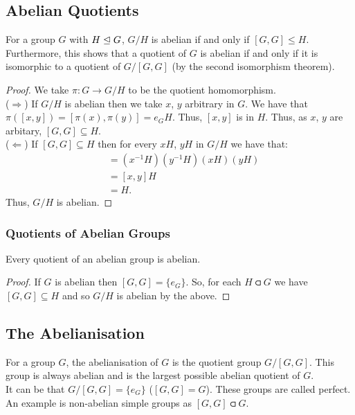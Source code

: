 \subsection{Abelian Quotients} \label{2.28}

For a group $G$ with $H \trianglelefteq G$, $G/H$ is abelian if and only if 
$[G, G] \leq H$. Furthermore, this shows that a quotient of $G$
is abelian if and only if it is isomorphic to a quotient of $G/[G, G]$
(by the second isomorphism theorem).

\begin{proof}
    We take $\pi : G \to G/H$ to be the quotient homomorphism.
    \\[\baselineskip]
    ($\Rightarrow$) 
    If $G/H$ is abelian then we take $x$, $y$ arbitrary in $G$. 
    We have that $\pi([x, y]) = [\pi(x), \pi(y)] = e_GH$. 
    Thus, $[x, y]$ is in $H$. 
    Thus, as $x$, $y$ are arbitary, $[G, G] \subseteq H$.
    \\[\baselineskip]
    ($\Leftarrow$)
    If $[G, G] \subseteq H$ then for every $xH$, $yH$ in $G/H$ we have
    that: \begin{align*}
        [xH, yH] &= (x^{-1}H)(y^{-1}H)(xH)(yH) \\
        &= [x, y]H \\
        &= H.
    \end{align*} Thus, $G/H$ is abelian.
\end{proof}

\subsubsection{Quotients of Abelian Groups}

Every quotient of an abelian group is abelian.

\begin{proof}
    If $G$ is abelian then $[G, G] = \{e_G\}$. So, for each $H \csub G$
    we have $[G, G] \subseteq H$ and so $G/H$ is abelian by the above.
\end{proof}

\subsection{The Abelianisation}

For a group $G$, the abelianisation of $G$ is the quotient group 
$G/[G, G]$. This group is always abelian and is the largest possible
abelian quotient of $G$.
\\[\baselineskip]
It can be that $G/[G, G] = \{e_G\}$ ($[G, G] = G$). These groups are
called perfect. An example is non-abelian simple groups as $[G, G] \csub G$.
